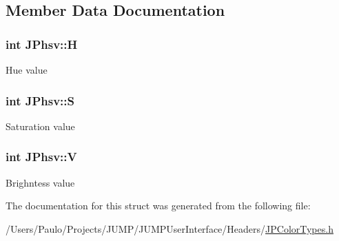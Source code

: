 \subsection{Member Data Documentation}
\hypertarget{struct_j_phsv_af51305d2a2125194b5a798e6e788b71f}{
\subsubsection[{H}]{\setlength{\rightskip}{0pt plus 5cm}int {\bf JPhsv::H}}}
\label{struct_j_phsv_af51305d2a2125194b5a798e6e788b71f}
Hue value \hypertarget{struct_j_phsv_a6576c0c116f985e6f5b4698290c8ae74}{
\subsubsection[{S}]{\setlength{\rightskip}{0pt plus 5cm}int {\bf JPhsv::S}}}
\label{struct_j_phsv_a6576c0c116f985e6f5b4698290c8ae74}
Saturation value \hypertarget{struct_j_phsv_ab1b3d51bc3064ceef684c4c957547773}{
\subsubsection[{V}]{\setlength{\rightskip}{0pt plus 5cm}int {\bf JPhsv::V}}}
\label{struct_j_phsv_ab1b3d51bc3064ceef684c4c957547773}
Brighntess value 

The documentation for this struct was generated from the following file:\begin{DoxyCompactItemize}
\item 
/Users/Paulo/Projects/JUMP/JUMPUserInterface/Headers/\hyperlink{_j_p_color_types_8h}{JPColorTypes.h}\end{DoxyCompactItemize}
